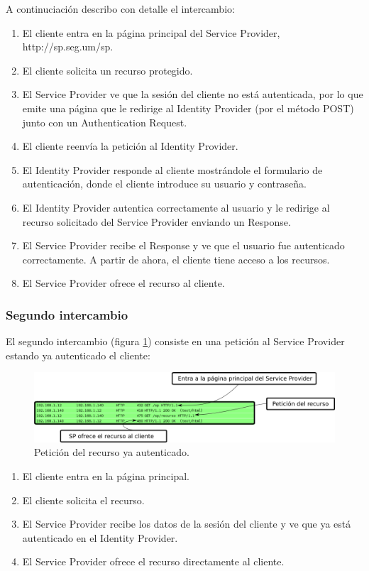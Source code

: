 A continuciación describo con detalle el intercambio:
\begin{enumerate}
 \item El cliente entra en la página principal del Service Provider, http://sp.seg.um/sp.
 \item El cliente solicita un recurso protegido.
 \item El Service Provider ve que la sesión del cliente no está autenticada, por lo que emite una página que le redirige al Identity Provider (por el método POST) junto con un Authentication Request.
 \item El cliente reenvía la petición al Identity Provider.
 \item El Identity Provider responde al cliente mostrándole el formulario de autenticación, donde el cliente introduce su usuario y contraseña.
 \item El Identity Provider autentica correctamente al usuario y le redirige al recurso solicitado del Service Provider enviando un Response.
 \item El Service Provider recibe el Response y ve que el usuario fue autenticado correctamente. A partir de ahora, el cliente tiene acceso a los recursos.
 \item El Service Provider ofrece el recurso al cliente.
\end{enumerate}

\subsubsection*{Segundo intercambio}
El segundo intercambio (figura \ref{fig:int2}) consiste en una petición al Service Provider estando ya autenticado el cliente:

\begin{figure}[h!]
\centering
\includegraphics[width=\textwidth]{img/intercambio2-comentado}
\caption{Petición del recurso ya autenticado.}
\label{fig:int2}
\end{figure}

\begin{enumerate}
 \item El cliente entra en la página principal.
 \item El cliente solicita el recurso.
 \item El Service Provider recibe los datos de la sesión del cliente y ve que ya está autenticado en el Identity Provider.
 \item El Service Provider ofrece el recurso directamente al cliente.
\end{enumerate}

